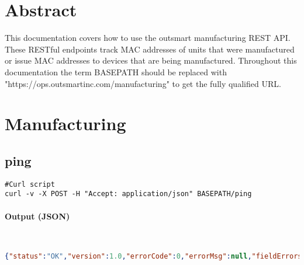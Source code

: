 \documentclass[
10pt, %
letterpaper, %
oneside, %
headinclude,footinclude, %
BCOR5mm, %
]{scrartcl}
\title{\normalfont\spacedallcaps{Manufacturing REST Documentation}} %
\author{\spacedlowsmallcaps{Michael Meding* , mmeding@outsmartinc.com}} %
\date{} %
\begin{document}
\maketitle %

\setcounter{tocdepth}{2} %

\tableofcontents %

\thispagestyle{empty} %

 
\section*{Abstract}
This documentation covers how to use the outsmart manufacturing REST API. These RESTful endpoints track MAC addresses of units that were manufactured or issue MAC addresses to devices that are being manufactured. Throughout this documentation the term BASEPATH should be replaced with "https://ops.outsmartinc.com/manufacturing" to get the fully qualified URL.

 


\section{Manufacturing}


\subsection{ping}
\begin{lstlisting}
#Curl script
curl -v -X POST -H "Accept: application/json" BASEPATH/ping
\end{lstlisting}

\paragraph{Output (JSON)}~
\begin{lstlisting}[language=json]
{"status":"OK","version":1.0,"errorCode":0,"errorMsg":null,"fieldErrors":null,"data":null}
\end{lstlisting}
\end{document}
